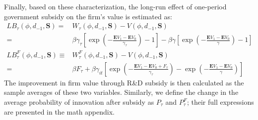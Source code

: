 \documentclass[English]{article}
\begin{document}
Finally, based on these characterization, the long-run effect of one-period government subsidy on the firm's value is estimated as:
\begin{align}\label{longsub1}
LB_{\tau}(\phi, d_{-1}, \mathbf{S})=&W_\tau(\phi, d_{-1}, \mathbf{S})-V(\phi, d_{-1}, \mathbf{S}) \\ \label{BS_zl}
               =&\beta\gamma_{\tau}\left[\exp \left (-\frac{\mathbf{E}V_1-\mathbf{E}V_0}{\gamma_\tau}\right)-1\right]-\beta\gamma\left[\exp \left (-\frac{\mathbf{E}V_1-\mathbf{E}V_0}{\gamma}\right)-1\right] \nonumber \\
LB_{\tau}^F(\phi, d_{-1}, \mathbf{S})\equiv&W_\tau^F(\phi, d_{-1}, \mathbf{S})-V(\phi, d_{-1}, \mathbf{S}) \label{BS_zfl} \\ 
                 =&\beta F_\tau+\beta \gamma_{it}\left[\exp\left (-\frac{\mathbf{E}V_1-\mathbf{E}V_0+F_\tau}{\gamma_\tau}\right)-\exp \left (-\frac{\mathbf{E}V_1-\mathbf{E}V_0}{\gamma}\right)\right] \nonumber
\end{align}
The improvement in firm value through R\&D subsidy is then calculated as the sample averages of these two variables. Similarly, we define the change in the average probability of innovation after subsidy as $P_\tau$ and $P_{\tau}^{F}$; their full expressions are presented in the math appendix.
\end{document}

